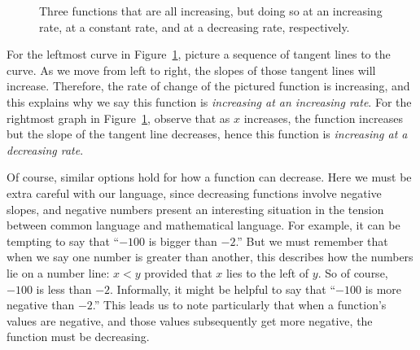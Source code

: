\begin{figure}
\begin{flushleft}
\caption{Three functions that are all increasing, but doing so at an increasing rate, at a constant rate, and at a decreasing rate, respectively.}\label{fig:2.3optsi}
\end{flushleft}
\end{figure}

For the leftmost curve in Figure~\ref{fig:2.3optsi}, picture a sequence of tangent lines to the curve.  As we move from left to right, the slopes of those tangent lines will increase.  Therefore, the rate of change of the pictured function is increasing, and this explains why we say this function is \emph{increasing at an increasing rate}.  For the rightmost graph in Figure~\ref{fig:2.3optsi}, observe that as $x$ increases, the function increases but the slope of the tangent line decreases, hence this function is \emph{increasing at a decreasing rate}.

Of course, similar options hold for how a function can decrease.  Here we must be extra careful with our language, since decreasing functions involve negative slopes, and negative numbers present an interesting situation in the tension between common language and mathematical language.  For example, it can be tempting to say that ``$-100$ is bigger than $-2$.''  But we must remember that when we say one number is greater than another, this describes how the numbers lie on a number line:  $x < y$ provided that $x$ lies to the left of $y$.  So of course, $-100$ is less than $-2$.  Informally, it might be helpful to say that ``$-100$ is more negative than $-2$.''  This leads us to note particularly that when a function's values are negative, and those values subsequently get more negative, the function must be decreasing.

